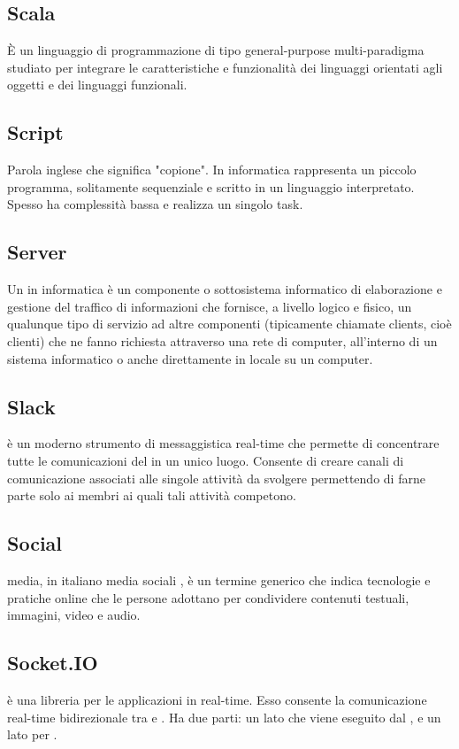 \subsection{Scala}
È un linguaggio di programmazione di tipo general-purpose multi-paradigma studiato per integrare le caratteristiche e funzionalità dei linguaggi orientati agli oggetti e dei linguaggi funzionali.

\subsection{Script}
Parola inglese che significa "copione". In informatica rappresenta un piccolo
programma, solitamente sequenziale e scritto in un linguaggio interpretato.
Spesso ha complessità bassa e realizza un singolo task.

\subsection{Server}
Un  in informatica è un componente o sottosistema informatico di elaborazione e gestione del traffico di informazioni che fornisce, a livello logico e fisico, un qualunque tipo di servizio ad altre componenti (tipicamente chiamate clients, cioè clienti) che ne fanno richiesta attraverso una rete di computer, all'interno di un sistema informatico o anche direttamente in locale su un computer.

\subsection{Slack}
 è un moderno strumento di messaggistica real-time che permette di concentrare tutte le comunicazioni del  in un unico luogo.
Consente di creare canali di comunicazione associati alle singole attività da svolgere permettendo di farne parte solo ai membri ai quali tali attività competono.

\subsection{Social}
 media, in italiano media sociali , è un termine generico che indica tecnologie e pratiche online che le persone adottano per condividere contenuti testuali, immagini, video e audio.

\subsection{Socket.IO}
 è una libreria  per le applicazioni  in real-time. Esso consente la comunicazione real-time bidirezionale tra  e  . Ha due parti: un lato  che viene eseguito dal  , e un lato  per .

